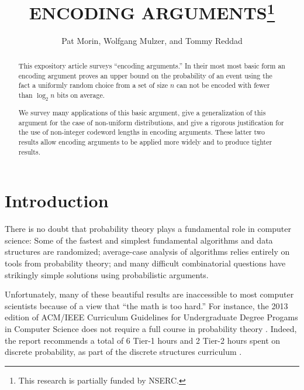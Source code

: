 \documentclass{patmorin}
\title{\MakeUppercase{Encoding Arguments}\thanks{This research is partially funded by NSERC.}}
\author{Pat Morin, Wolfgang Mulzer, and Tommy Reddad}
\date{}
\begin{document}
\begin{titlepage}
\maketitle


\begin{abstract}
  \setlength{\baselineskip}{15.84pt}

  This expository article surveys ``encoding arguments.'' In their
  most most basic form an encoding argument proves an upper bound on
  the probability of an event using the fact a uniformly random choice
  from a set of size $n$ can not be encoded with fewer than $\log_2 n$
  bits on average.

  We survey many applications of this basic argument, give a
  generalization of this argument for the case of non-uniform
  distributions, and give a rigorous justification for the use of
  non-integer codeword lengths in encoding arguments.  These latter
  two results allow encoding arguments to be applied more widely and
  to produce tighter results.
\end{abstract}


\end{titlepage}
\tableofcontents
\newpage
{}

\section{Introduction}
\setlength{\baselineskip}{15.84pt}

There is no doubt that probability theory plays a fundamental role in
computer science: Some of the fastest and simplest fundamental
algorithms and data structures are randomized; average-case analysis
of algorithms relies entirely on tools from probability theory; and
many difficult combinatorial questions have strikingly simple
solutions using probabilistic arguments.

Unfortunately, many of these beautiful results are inaccessible to
most computer scientists because of a view that ``the math is too
hard.''  For instance, the 2013 edition of ACM/IEEE Curriculum
Guidelines for Undergraduate Degree Progams in Computer Science does
not require a full course in probability theory
\cite[Page~50]{computing-curricula:computer}. Indeed, the report
recommends a total of 6 Tier-1 hours and 2 Tier-2 hours spent on
discrete probability, as part of the discrete structures curriculum
\cite[Page~77]{computing-curricula:computer}.
\end{document}
